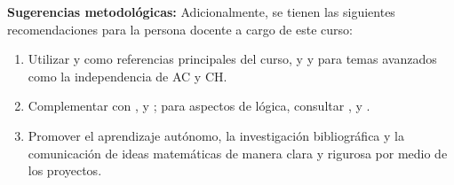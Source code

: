 \begin{refsection}
\textbf{Sugerencias metodológicas:} Adicionalmente, se tienen las siguientes recomendaciones para la persona docente a cargo de este curso:

\begin{enumerate}
    \item Utilizar \cite{Hal74} y \cite{End77} como referencias principales del curso, y \cite{Jec03} y \cite{Kun80} para temas avanzados como la independencia de AC y CH.
    \item Complementar con \cite{Dev93}, \cite{Sup72} y \cite{Hal17}; para aspectos de lógica, consultar \cite{HiL19}, \cite{CL2000} y \cite{EFT94}.
    \item Promover el aprendizaje autónomo, la investigación bibliográfica y la comunicación de ideas matemáticas de manera clara y rigurosa por medio de los proyectos.
\end{enumerate}

\nocite{Hal74}
\nocite{Jec03}
\nocite{Kun80}
\nocite{End77}
\nocite{Dev93}
\nocite{Sup72}
\nocite{Hal17}
\nocite{HiL19}
\nocite{CL2000}
\nocite{EFT94}

\printcursosbibliography
\end{refsection}
